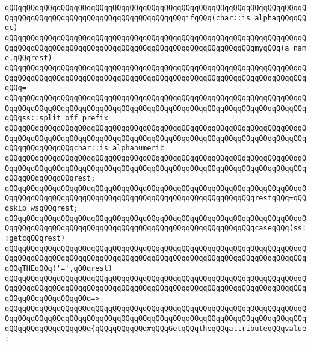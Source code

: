\verb|qQQqqQQqqQQqqQQqqQQqqQQqqQQqqQQqqQQqqQQqqQQqqQQqqQQqqQQqqQQqqQQqqQQqqQQqqQQqqQQqqQQqqQQqqQQqqQQqqQQqqQQqqQQqqQQqifqQQq(char::is_alphaqQQqqQQqc)|\newline
\newline
\verb|qQQqqQQqqQQqqQQqqQQqqQQqqQQqqQQqqQQqqQQqqQQqqQQqqQQqqQQqqQQqqQQqqQQqqQQqqQQqqQQqqQQqqQQqqQQqqQQqqQQqqQQqqQQqqQQqqQQqqQQqqQQqqQQqmyqQQq(a_name,qQQqrest)|\newline
\verb|qQQqqQQqqQQqqQQqqQQqqQQqqQQqqQQqqQQqqQQqqQQqqQQqqQQqqQQqqQQqqQQqqQQqqQQqqQQqqQQqqQQqqQQqqQQqqQQqqQQqqQQqqQQqqQQqqQQqqQQqqQQqqQQqqQQqqQQqqQQqqQQq=|\newline
\verb|qQQqqQQqqQQqqQQqqQQqqQQqqQQqqQQqqQQqqQQqqQQqqQQqqQQqqQQqqQQqqQQqqQQqqQQqqQQqqQQqqQQqqQQqqQQqqQQqqQQqqQQqqQQqqQQqqQQqqQQqqQQqqQQqqQQqqQQqqQQqqQQqss::split_off_prefix|\newline
\verb|qQQqqQQqqQQqqQQqqQQqqQQqqQQqqQQqqQQqqQQqqQQqqQQqqQQqqQQqqQQqqQQqqQQqqQQqqQQqqQQqqQQqqQQqqQQqqQQqqQQqqQQqqQQqqQQqqQQqqQQqqQQqqQQqqQQqqQQqqQQqqQQqqQQqqQQqqQQqchar::is_alphanumeric|\newline
\verb|qQQqqQQqqQQqqQQqqQQqqQQqqQQqqQQqqQQqqQQqqQQqqQQqqQQqqQQqqQQqqQQqqQQqqQQqqQQqqQQqqQQqqQQqqQQqqQQqqQQqqQQqqQQqqQQqqQQqqQQqqQQqqQQqqQQqqQQqqQQqqQQqqQQqqQQqqQQqrest;|\newline
\newline
\verb|qQQqqQQqqQQqqQQqqQQqqQQqqQQqqQQqqQQqqQQqqQQqqQQqqQQqqQQqqQQqqQQqqQQqqQQqqQQqqQQqqQQqqQQqqQQqqQQqqQQqqQQqqQQqqQQqqQQqqQQqqQQqqQQqrestqQQq=qQQqskip_wsqQQqrest;|\newline
\newline
\verb|qQQqqQQqqQQqqQQqqQQqqQQqqQQqqQQqqQQqqQQqqQQqqQQqqQQqqQQqqQQqqQQqqQQqqQQqqQQqqQQqqQQqqQQqqQQqqQQqqQQqqQQqqQQqqQQqqQQqqQQqqQQqqQQqcaseqQQq(ss::getcqQQqrest)|\newline
\newline
\verb|qQQqqQQqqQQqqQQqqQQqqQQqqQQqqQQqqQQqqQQqqQQqqQQqqQQqqQQqqQQqqQQqqQQqqQQqqQQqqQQqqQQqqQQqqQQqqQQqqQQqqQQqqQQqqQQqqQQqqQQqqQQqqQQqqQQqqQQqqQQqqQQqTHEqQQq('=',qQQqrest)|\newline
\verb|qQQqqQQqqQQqqQQqqQQqqQQqqQQqqQQqqQQqqQQqqQQqqQQqqQQqqQQqqQQqqQQqqQQqqQQqqQQqqQQqqQQqqQQqqQQqqQQqqQQqqQQqqQQqqQQqqQQqqQQqqQQqqQQqqQQqqQQqqQQqqQQqqQQqqQQqqQQqqQQq=>|\newline
\verb|qQQqqQQqqQQqqQQqqQQqqQQqqQQqqQQqqQQqqQQqqQQqqQQqqQQqqQQqqQQqqQQqqQQqqQQqqQQqqQQqqQQqqQQqqQQqqQQqqQQqqQQqqQQqqQQqqQQqqQQqqQQqqQQqqQQqqQQqqQQqqQQqqQQqqQQqqQQqqQQq{qQQqqQQqqQQq#qQQqGetqQQqtheqQQqattributeqQQqvalue:|\newline
